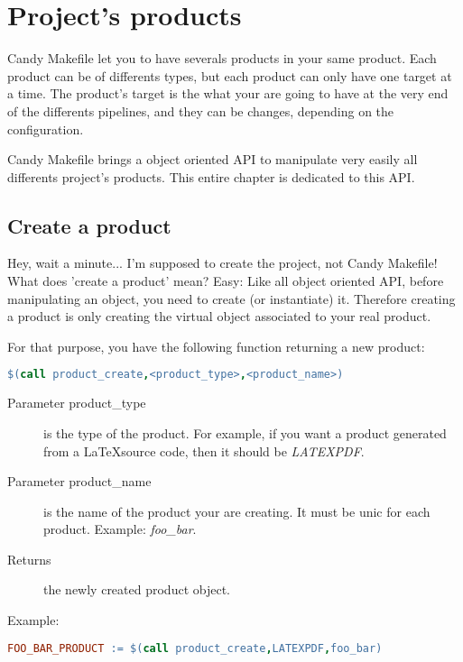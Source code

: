 \chapter{Project's products}

Candy Makefile let you to have severals products in your same product. Each product can
be of differents types, but each product can only have one target at a time. The product's
target is the what your are going to have at the very end of the differents pipelines, and
they can be changes, depending on the configuration.

Candy Makefile brings a object oriented API to manipulate very easily all differents
project's products. This entire chapter is dedicated to this API.


\section{Create a product}

Hey, wait a minute... I'm supposed to create the project, not Candy Makefile!
What does 'create a product' mean? Easy: Like all object oriented API, before manipulating
an object, you need to create (or instantiate) it. Therefore creating a product is only
creating the virtual object associated to your real product.

For that purpose, you have the following function returning a new product:

\begin{lstlisting}[language=make]
$(call product_create,<product_type>,<product_name>)
\end{lstlisting}

\begin{description}
    \item[Parameter product\_type] is the type of the product. For example, if you want a
    product generated from a \LaTeX source code, then it should be \textit{LATEXPDF}.
    \item[Parameter product\_name] is the name of the product your are creating. It must be
    unic for each product. Example: \textit{foo\_bar}.
    \item[Returns] the newly created product object.
\end{description}

Example:
\begin{lstlisting}[language=make]
FOO_BAR_PRODUCT := $(call product_create,LATEXPDF,foo_bar)
\end{lstlisting}


